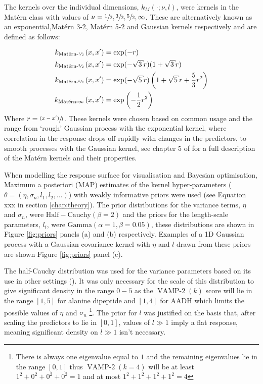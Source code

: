The kernels over the individual dimensions, $k_{M}(\cdot; \nu, l)$, were kernels in the Mat\'{e}rn class with values of $\nu=\sfrac{1}{2},\sfrac{3}{2},\sfrac{5}{2},\infty$. These are alternatively known as an exponential,Mat\'{e}rn 3-2, Mat\'{e}rn 5-2 and  Gaussian kernels respectively and are defined as follows: 

\begin{align}
k_{\text{Mat\'{e}rn-\sfrac{1}{2}}}\left(x, x^{\prime}\right) &=\exp (-r) \label{eqn:kern_exp}\\
k_{\text{Mat\'{e}rn-\sfrac{3}{2}}}\left(x, x^{\prime}\right) &= \exp (-\sqrt{3} r)(1+\sqrt{3} r) \label{eqn:kern_m32} \\
k_{\text{Mat\'{e}rn-\sfrac{5}{2}}}\left(x, x^{\prime}\right) &= \exp (-\sqrt{5} r)\left(1+\sqrt{5} r+\frac{5}{3} r^{2}\right) \label{eqn:kern_m52}\\
k_{\text{Mat\'{e}rn-}\infty}\left(x, x^{\prime}\right) &= \exp \left(-\frac{1}{2} r^{2}\right) \label{eqn:kern_gauss}
\end{align}
Where $r = \sfrac{(x-x^{\prime})}{l}$. These kernels were chosen based on common usage \cite{shahriariTakingHumanOut} and the range from `rough' Gaussian process with the exponential kernel, where correlation in the response drops off rapidly with changes in the predictors, to smooth processes with the Gaussian kernel, see chapter 5 of \cite{rasmussenGaussianProcessesMachine2006} for a full description of the Mat\'{e}rn kernels and their properties.  

When modelling the response surface for visualisation and Bayesian optimisation, Maximum a posteriori (MAP) estimates  of the kernel hyper-parameters ($\theta = (\eta, \sigma_{n}, l_{1}, l_{2}, ...)$) with weakly informative priors were used (see Equation xxx in section \ref{chap:theory}). The prior distributions for the variance terms, $\eta$ and $\sigma_{n}$, were $\mathrm{Half-Cauchy}(\beta=2)$ and the priors for the length-scale parameters, $l_{i}$, were $\mathrm{Gamma}(\alpha=1, \beta=0.05)$, these distributions are shown in Figure \ref{fig:priors} panels (a) and (b) respectively.  Examples of a 1D Gaussian process with a Gaussian covariance kernel with $\eta$ and $l$ drawn from these priors are shown Figure \ref{fig:priors} panel (c).  
 
The half-Cauchy distribution  was used for the variance parameters  based on its use in other settings (\cite{polsonHalfCauchyPriorGlobal2012}). It was  only necessary for the scale of this distribution to give significant density in the range $0-5$ as the $\operatorname{VAMP-2}(k)$ score will lie in the range $[1,5]$ for alanine dipeptide and $[1, 4]$ for AADH which limits the possible values of $\eta$ and $\sigma_{n}$ \footnote{There is always one eigenvalue equal to $1$ and the remaining eigenvalues lie in the range $[0, 1]$ thus $\operatorname{VAMP-2}(k=4)$ will be at least $1^2 + 0^2 + 0^2 + 0^2=1$ and at most $1^2 + 1^2 + 1^2 + 1^2=4$}. The prior for $l$ was justified on the basis that, after scaling the predictors to lie in $[0, 1]$, values of $l \gg 1$ imply a flat response, meaning significant density on $l \gg 1$ isn't necessary. 

